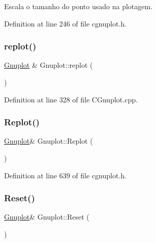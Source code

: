 Escala o tamanho do ponto usado na plotagem. 



Definition at line 246 of file cgnuplot.\+h.

\mbox{\label{class_gnuplot_ae4f110479cfd8dc9b1b3d45809fb05e0}} 
\subsubsection{\texorpdfstring{replot()}{replot()}}
{\footnotesize\ttfamily \hyperlink{class_gnuplot}{Gnuplot} \& Gnuplot\+::replot (\begin{DoxyParamCaption}{ }\end{DoxyParamCaption})}



Definition at line 328 of file C\+Gnuplot.\+cpp.

\mbox{\label{class_gnuplot_a565fb1504cd88277e3c2092ad2234234}} 
\subsubsection{\texorpdfstring{Replot()}{Replot()}}
{\footnotesize\ttfamily \hyperlink{class_gnuplot}{Gnuplot}\& Gnuplot\+::\+Replot (\begin{DoxyParamCaption}{ }\end{DoxyParamCaption})\hspace{0.3cm}{\ttfamily [inline]}}



Definition at line 639 of file cgnuplot.\+h.

\mbox{\label{class_gnuplot_ae32093aa955bc31938d9cb266085ae4b}} 
\subsubsection{\texorpdfstring{Reset()}{Reset()}}
{\footnotesize\ttfamily \hyperlink{class_gnuplot}{Gnuplot}\& Gnuplot\+::\+Reset (\begin{DoxyParamCaption}{ }\end{DoxyParamCaption})\hspace{0.3cm}{\ttfamily [inline]}}



